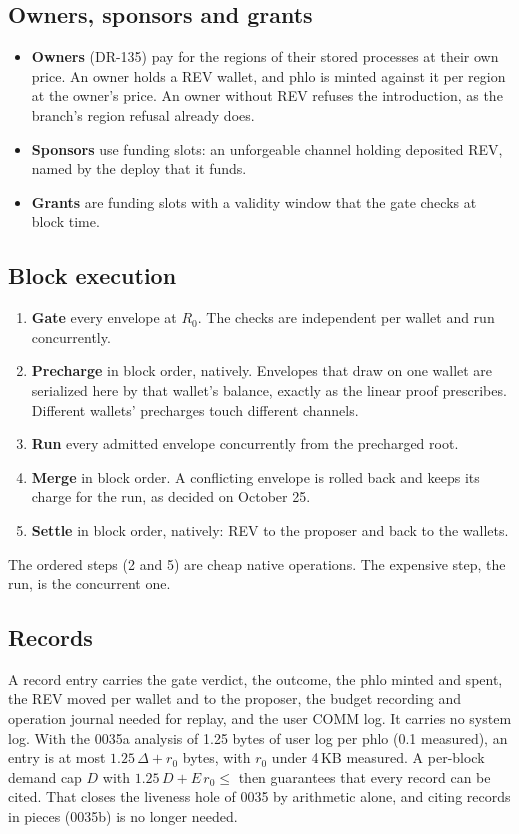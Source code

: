 \documentclass[11pt]{article}
\newcommand{\code}{\path}
\begin{document}
\subsection{Owners, sponsors and grants}

\begin{itemize}
\item \textbf{Owners} (DR-135) pay for the regions of their stored processes at their own price. An owner holds a REV wallet, and phlo is minted against it per region at the owner's price. An owner without REV refuses the introduction, as the branch's region refusal already does.
\item \textbf{Sponsors} use funding slots: an unforgeable channel holding deposited REV, named by the deploy that it funds.
\item \textbf{Grants} are funding slots with a validity window that the gate checks at block time.
\end{itemize}

\subsection{Block execution}

\begin{enumerate}
\item \textbf{Gate} every envelope at $R_0$. The checks are independent per wallet and run concurrently.
\item \textbf{Precharge} in block order, natively. Envelopes that draw on one wallet are serialized here by that wallet's balance, exactly as the linear proof prescribes. Different wallets' precharges touch different channels.
\item \textbf{Run} every admitted envelope concurrently from the precharged root.
\item \textbf{Merge} in block order. A conflicting envelope is rolled back and keeps its charge for the run, as decided on October 25.
\item \textbf{Settle} in block order, natively: REV to the proposer and back to the wallets.
\end{enumerate}
The ordered steps (2 and 5) are cheap native operations. The expensive step, the run, is the concurrent one.

\subsection{Records}

A record entry carries the gate verdict, the outcome, the phlo minted and spent, the REV moved per wallet and to the proposer, the budget recording and operation journal needed for replay, and the user COMM log. It carries no system log. With the 0035a analysis of 1.25 bytes of user log per phlo (0.1 measured), an entry is at most $1.25\,\Delta + r_0$ bytes, with $r_0$ under 4\,KB measured. A per-block demand cap $D$ with $1.25\,D + E\,r_0 \le$ \code{block-record-bytes} then guarantees that every record can be cited. That closes the liveness hole of 0035 by arithmetic alone, and citing records in pieces (0035b) is no longer needed.
\end{document}
